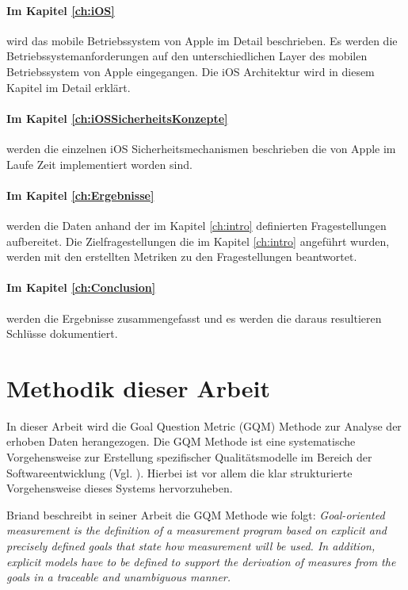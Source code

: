 \paragraph{Im Kapitel \ref{ch:iOS}} wird das mobile Betriebssystem von Apple im Detail beschrieben. Es werden die Betriebssystemanforderungen auf den unterschiedlichen Layer des mobilen Betriebssystem von Apple eingegangen. Die iOS Architektur wird in diesem Kapitel im Detail erklärt. 

\paragraph{Im Kapitel \ref{ch:iOSSicherheitsKonzepte}} werden die einzelnen iOS Sicherheitsmechanismen beschrieben die von Apple im Laufe Zeit implementiert worden sind.

\paragraph{Im Kapitel \ref{ch:Ergebnisse}} werden die Daten anhand der im Kapitel \ref{ch:intro} definierten Fragestellungen aufbereitet. Die Zielfragestellungen die im Kapitel \ref{ch:intro} angeführt wurden, werden mit den erstellten Metriken zu den Fragestellungen beantwortet.

\paragraph{Im Kapitel \ref{ch:Conclusion}} werden die Ergebnisse zusammengefasst und es werden die daraus resultieren Schlüsse dokumentiert.

\section{Methodik dieser Arbeit}
\label{sec:MethArbeit}
In dieser Arbeit wird die Goal Question Metric (GQM) Methode zur Analyse der erhoben Daten herangezogen. Die GQM Methode ist eine systematische Vorgehensweise zur Erstellung spezifischer Qualitätsmodelle im Bereich der Softwareentwicklung (Vgl. \cite{GQM[1], GQM[2]}).  Hierbei ist vor allem die klar strukturierte Vorgehensweise dieses Systems hervorzuheben.\par

Briand beschreibt in seiner Arbeit die GQM Methode wie folgt: \textit{\glqq Goal-oriented measurement is the definition of a measurement program based on explicit and precisely defined goals that state how measurement will be used. In addition, explicit models have to be defined to support the derivation of measures from the goals in a traceable and unambiguous manner.\grqq{}} \cite{GQM[5]}
 
